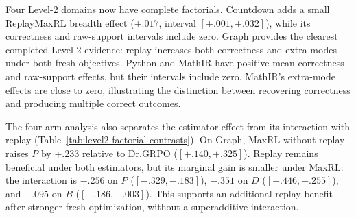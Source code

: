 \documentclass{article}
\newcommand{\1}{\mathbf 1}
\theoremstyle{remark}
\theoremstyle{definition}
\theoremstyle{plain}
\begin{document}
Four Level-2 domains now have complete factorials. Countdown adds a small
ReplayMaxRL breadth effect ($+.017$, interval $[+.001,+.032]$), while its
correctness and raw-support intervals include zero. Graph provides the
clearest completed Level-2 evidence: replay increases
both correctness and extra modes under both fresh objectives. Python and
MathIR have positive mean correctness and raw-support effects, but their
intervals include zero. MathIR's extra-mode effects are close to zero,
illustrating the distinction between recovering correctness and producing
multiple correct outcomes.

The four-arm analysis also separates the estimator effect from its
interaction with replay (Table~\ref{tab:level2-factorial-contrasts}). On
Graph, MaxRL without replay raises $P$ by $+.233$ relative to Dr.GRPO
($[+.140,+.325]$). Replay remains beneficial under both estimators, but its
marginal gain is smaller under MaxRL: the interaction is $-.256$ on $P$
($[-.329,-.183]$), $-.351$ on $D$ ($[-.446,-.255]$), and $-.095$ on $B$
($[-.186,-.003]$). This supports an additional replay benefit after stronger
fresh optimization, without a superadditive interaction.

\begin{table}[H]
  \centering
  \caption{\textbf{Fresh-objective effects and replay interactions on Level 2.}
  All three contrasts within a domain use the same four-arm seed
  intersection. The interaction is
  $(\mathrm{ReplayMaxRL}-\mathrm{MaxRL})-
  (\mathrm{ReplayDr.GRPO}-\mathrm{Dr.GRPO})$.
  Each entry gives its mean and, only for a complete five-seed block, a
  paired unadjusted 95\% Student-$t$ interval.}
  \label{tab:level2-factorial-contrasts}
  \scriptsize
  \setlength{\tabcolsep}{3pt}
\end{table}

\begin{table}[H]
  \centering
  \caption{\textbf{Uniform versus fresh-frequency replay at pass 8.}
  Effects are uniform minus frequency weighting. Brackets give the paired
  percentile bootstrap interval for $\Delta B$ over all $5^5$ ordered
  resamples in complete blocks. Every observed treatment endpoint in this
  snapshot passes the persisted replay-weight telemetry audit. Partial
  blocks remain descriptive; Qwen2.5-3B PantryPlan has no pairs.}
  \label{tab:current-e120}
  \scriptsize
  \setlength{\tabcolsep}{3pt}
\end{table}
\end{document}
